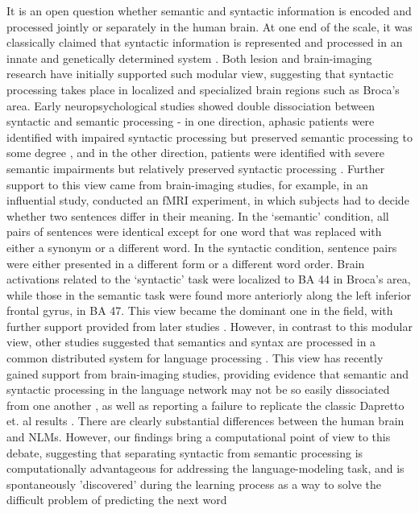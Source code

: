 It is an open question whether semantic and syntactic information is encoded and processed jointly or separately in the human brain. At one end of the scale, it was classically claimed that syntactic information is represented and processed in an innate and genetically determined system \citep[e.g.,][]{fodor1983modularity, chomsky1984modular, Pinker:1994}. Both lesion and brain-imaging research have initially supported such modular view, suggesting that syntactic processing takes place in localized and specialized brain regions such as Broca's area. Early neuropsychological studies showed double dissociation between syntactic and semantic processing - in one direction, aphasic patients were identified with impaired syntactic processing but preserved semantic processing to some degree \citep{caramazza1976dissociation}, and in the other direction, patients were identified with severe semantic impairments but relatively preserved syntactic processing \citep{breedin1994reversal,hodges1996nonfluent, breedin1999sentence}. Further support to this view came from brain-imaging studies, for example, in an influential study, \citet{dapretto1999form} conducted an fMRI experiment, in which subjects had to decide whether two sentences differ in their meaning. In the `semantic' condition, all pairs of sentences were identical except for one word that was replaced with either a synonym or a different word. In the syntactic condition, sentence pairs were either presented in a different form or a different word order. Brain activations related to the `syntactic' task were localized to BA 44 in Broca’s area, while those in the semantic task were found more anteriorly along the left inferior frontal gyrus, in BA 47. This view became the dominant one in the field, with further support provided from later studies \citep[e.g., ][]{embick2000syntactic, vigliocco2000language, hashimoto2002specialization, garrard2004dissociation, friederici2006processing, pallier2011cortical, hagoort2014nodes}. However, in contrast to this modular view, other studies suggested that semantics and syntax are processed in a common distributed system for language processing \citep[e.g.,][]{bates1989functionalism, dick2001language, bates2002language}. This view has recently gained support from brain-imaging studies, providing evidence that semantic and syntactic processing in the language network may not be so easily dissociated from one another \citep{mollica2018high, fedorenko2020lack}, as well as reporting a failure to replicate the classic Dapretto et. al results \citep{siegelman2019attempt}. There are clearly substantial differences between the human brain and NLMs. However, our findings bring a computational point of view to this debate, suggesting that separating syntactic from semantic processing is computationally advantageous for addressing the language-modeling task, and is spontaneously 'discovered' during the learning process as a way to solve the difficult problem of predicting the next word \citep[see also, ][for related studies.]{ullman2004contributions, o2006biologically, russin2019reilly} 

